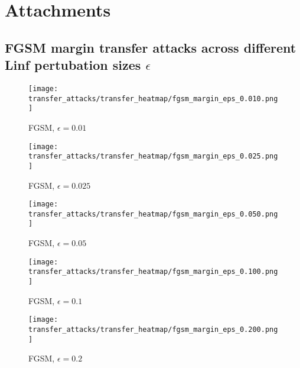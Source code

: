 
\appendix
\chapter{Attachments}

\section{FGSM margin transfer attacks across different Linf pertubation sizes $\epsilon$}

\begin{figure}[h]
  \texttt{[image: transfer\_attacks/transfer\_heatmap/fgsm\_margin\_eps\_0.010.png]}
  \caption{FGSM, $\epsilon = 0.01$}
\endminipage\hfill
{}
  \texttt{[image: transfer\_attacks/transfer\_heatmap/fgsm\_margin\_eps\_0.025.png]}
  \caption{FGSM, $\epsilon = 0.025$}
\endminipage\hfill
\end{figure}


\begin{figure}[h]
  \texttt{[image: transfer\_attacks/transfer\_heatmap/fgsm\_margin\_eps\_0.050.png]}
  \caption{FGSM, $\epsilon = 0.05$}
\endminipage\hfill
{}
  \texttt{[image: transfer\_attacks/transfer\_heatmap/fgsm\_margin\_eps\_0.100.png]}
  \caption{FGSM, $\epsilon = 0.1$}
\endminipage\hfill
\end{figure}

\begin{figure}[h]
  \texttt{[image: transfer\_attacks/transfer\_heatmap/fgsm\_margin\_eps\_0.200.png]}
  \caption{FGSM, $\epsilon = 0.2$}
\endminipage\hfill
\end{figure}